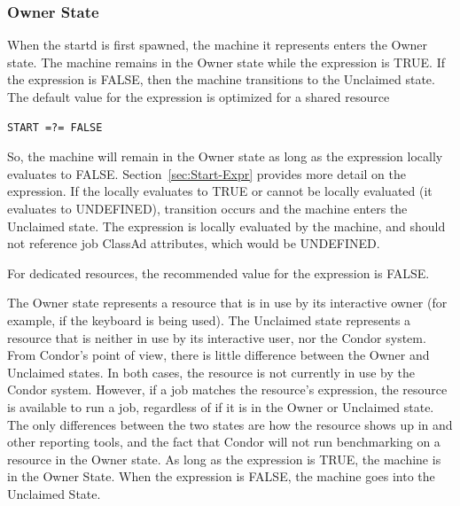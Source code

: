 \subsubsection{\label{sec:Owner-State}
Owner State}

When the startd is first spawned, the machine it represents enters the
Owner state. 
The machine remains in the Owner state while the
expression  is TRUE.
If the  expression is FALSE,
then the machine transitions to the Unclaimed state.
The default value for the 
 expression is optimized for a shared resource
\begin{verbatim}
START =?= FALSE
\end{verbatim}
So,
the machine will remain in the Owner state as long as the 
expression locally evaluates to FALSE.
Section~\ref{sec:Start-Expr} provides more detail on the
 expression.
If the  locally evaluates to TRUE or cannot be locally
evaluated (it evaluates to UNDEFINED), transition 
occurs and the machine enters the Unclaimed state.
The  expression is locally evaluated by the machine,
and should not reference job ClassAd attributes, which would be
UNDEFINED.

For dedicated resources, the recommended value for the 
expression is FALSE.

The Owner state represents a resource that is in use by its
interactive owner (for example, if the keyboard is being used).
The Unclaimed state represents a resource that is neither in use by
its interactive user, nor the Condor system.
From Condor's point of view, there is little difference between the
Owner and Unclaimed states.
In both cases, the resource is not currently in use by the Condor
system.
However, if a job matches the resource's  expression, the
resource is available to run a job, regardless of if it is in the
Owner or Unclaimed state.
The only differences between the two states are how the resource shows
up in  and other reporting tools, and the fact that
Condor will not run benchmarking on a resource in the Owner state.
As long as the  expression is TRUE, the machine is
in the Owner State.
When the  expression is FALSE, the machine goes into
the Unclaimed State.

